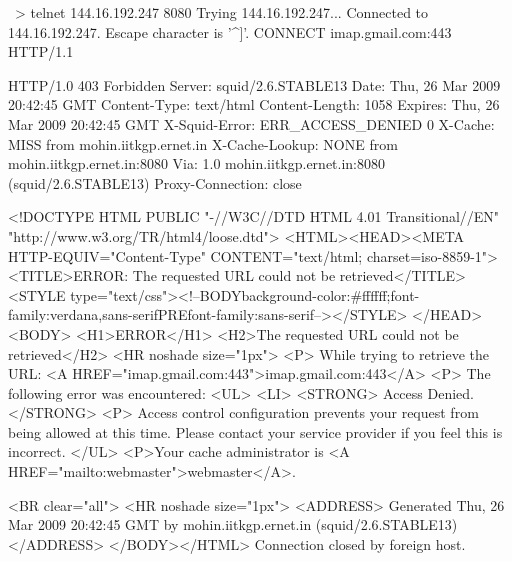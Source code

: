 ~> telnet 144.16.192.247 8080
Trying 144.16.192.247...
Connected to 144.16.192.247.
Escape character is '^]'.
CONNECT imap.gmail.com:443 HTTP/1.1

HTTP/1.0 403 Forbidden
Server: squid/2.6.STABLE13
Date: Thu, 26 Mar 2009 20:42:45 GMT
Content-Type: text/html
Content-Length: 1058
Expires: Thu, 26 Mar 2009 20:42:45 GMT
X-Squid-Error: ERR_ACCESS_DENIED 0
X-Cache: MISS from mohin.iitkgp.ernet.in
X-Cache-Lookup: NONE from mohin.iitkgp.ernet.in:8080
Via: 1.0 mohin.iitkgp.ernet.in:8080 (squid/2.6.STABLE13)
Proxy-Connection: close

<!DOCTYPE HTML PUBLIC "-//W3C//DTD HTML 4.01 Transitional//EN" "http://www.w3.org/TR/html4/loose.dtd">
<HTML><HEAD><META HTTP-EQUIV="Content-Type" CONTENT="text/html; charset=iso-8859-1">
<TITLE>ERROR: The requested URL could not be retrieved</TITLE>
<STYLE type="text/css"><!--BODY{background-color:#ffffff;font-family:verdana,sans-serif}PRE{font-family:sans-serif}--></STYLE>
</HEAD><BODY>
<H1>ERROR</H1>
<H2>The requested URL could not be retrieved</H2>
<HR noshade size="1px">
<P>
While trying to retrieve the URL:
<A HREF="imap.gmail.com:443">imap.gmail.com:443</A>
<P>
The following error was encountered:
<UL>
<LI>
<STRONG>
Access Denied.
</STRONG>
<P>
Access control configuration prevents your request from
being allowed at this time.  Please contact your service provider if
you feel this is incorrect.
</UL>
<P>Your cache administrator is <A HREF="mailto:webmaster">webmaster</A>. 


<BR clear="all">
<HR noshade size="1px">
<ADDRESS>
Generated Thu, 26 Mar 2009 20:42:45 GMT by mohin.iitkgp.ernet.in (squid/2.6.STABLE13)
</ADDRESS>
</BODY></HTML>
Connection closed by foreign host.
